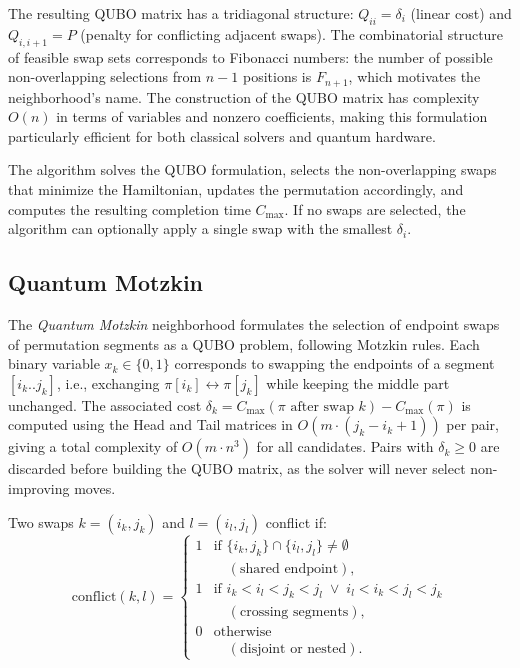 \documentclass[10pt,twoside,twocolumn,a4paper]{article}
\begin{document}
The resulting QUBO matrix has a tridiagonal structure: $Q_{ii} = \delta_i$ (linear cost) and $Q_{i,i+1} = P$ (penalty for conflicting adjacent swaps). The combinatorial structure of feasible swap sets corresponds to Fibonacci numbers: the number of possible non-overlapping selections from $n-1$ positions is $F_{n+1}$, which motivates the neighborhood’s name. The construction of the QUBO matrix has complexity $O(n)$ in terms of variables and nonzero coefficients, making this formulation particularly efficient for both classical solvers and quantum hardware.

The algorithm solves the QUBO formulation, selects the non-overlapping swaps that minimize the Hamiltonian, updates the permutation accordingly, and computes the resulting completion time $C_{\max}$. If no swaps are selected, the algorithm can optionally apply a single swap with the smallest $\delta_i$.


\subsection{Quantum Motzkin}
The \emph{Quantum Motzkin} neighborhood formulates the selection of endpoint swaps of permutation segments as a QUBO problem, following Motzkin rules. Each binary variable $x_k \in \{0,1\}$ corresponds to swapping the endpoints of a segment $[i_k..j_k]$, i.e., exchanging $\pi[i_k] \leftrightarrow \pi[j_k]$ while keeping the middle part unchanged. The associated cost $\delta_k = C_{\max}(\pi \text{ after swap } k) - C_{\max}(\pi)$ is computed using the Head and Tail matrices in $O(m \cdot (j_k - i_k + 1))$ per pair, giving a total complexity of $O(m \cdot n^3)$ for all candidates. Pairs with $\delta_k \ge 0$ are discarded before building the QUBO matrix, as the solver will never select non-improving moves.

Two swaps $k = (i_k, j_k)$ and $l = (i_l, j_l)$ conflict if:
\begin{equation}
\mathrm{conflict}(k,l) =
\begin{cases}
1 & \text{if } \{i_k, j_k\} \cap \{i_l, j_l\} \neq \emptyset \\
  & \quad (\text{shared endpoint}), \\
1 & \text{if } i_k < i_l < j_k < j_l \;\vee\; i_l < i_k < j_l < j_k \\
  & \quad (\text{crossing segments}), \\
0 & \text{otherwise} \\
  & \quad (\text{disjoint or nested}).
\end{cases}
\end{equation}
\end{document}
